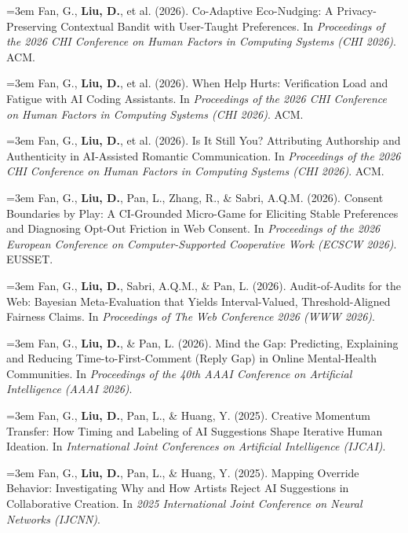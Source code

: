 \documentclass[a4paper,11pt]{article}
\newcommand{\publication}[2]{%
  \par\addvspace{8pt}\noindent
  \begin{minipage}{\linewidth}
    \linespread{1.06}\fontsize{10.8}{13.4}\selectfont\raggedright
    \hangindent=3em\hangafter=1
    \makebox[3em][l]{\textcolor{teal}{[#1]}}#2
  \end{minipage}\par}
\begin{document}
\publication{R5}{Fan, G., \textbf{Liu, D.}, et al. (2026). Co-Adaptive Eco-Nudging: A Privacy-Preserving Contextual Bandit with User-Taught Preferences. In \emph{Proceedings of the 2026 CHI Conference on Human Factors in Computing Systems (CHI 2026)}. ACM.}

\publication{R6}{Fan, G., \textbf{Liu, D.}, et al. (2026). When Help Hurts: Verification Load and Fatigue with AI Coding Assistants. In \emph{Proceedings of the 2026 CHI Conference on Human Factors in Computing Systems (CHI 2026)}. ACM.}

\publication{R7}{Fan, G., \textbf{Liu, D.}, et al. (2026). Is It Still You? Attributing Authorship and Authenticity in AI-Assisted Romantic Communication. In \emph{Proceedings of the 2026 CHI Conference on Human Factors in Computing Systems (CHI 2026)}. ACM.}

\publication{R8}{Fan, G., \textbf{Liu, D.}, Pan, L., Zhang, R., \& Sabri, A.Q.M. (2026). Consent Boundaries by Play: A CI-Grounded Micro-Game for Eliciting Stable Preferences and Diagnosing Opt-Out Friction in Web Consent. In \emph{Proceedings of the 2026 European Conference on Computer-Supported Cooperative Work (ECSCW 2026)}. EUSSET.}

\publication{R9}{Fan, G., \textbf{Liu, D.}, Sabri, A.Q.M., \& Pan, L. (2026). Audit-of-Audits for the Web: Bayesian Meta-Evaluation that Yields Interval-Valued, Threshold-Aligned Fairness Claims. In \emph{Proceedings of The Web Conference 2026 (WWW 2026)}.}

\publication{R10}{Fan, G., \textbf{Liu, D.}, \& Pan, L. (2026). Mind the Gap: Predicting, Explaining and Reducing Time-to-First-Comment (Reply Gap) in Online Mental-Health Communities. In \emph{Proceedings of the 40th AAAI Conference on Artificial Intelligence (AAAI 2026)}.}

\publication{R11}{Fan, G., \textbf{Liu, D.}, Pan, L., \& Huang, Y. (2025). Creative Momentum Transfer: How Timing and Labeling of AI Suggestions Shape Iterative Human Ideation. In \emph{International Joint Conferences on Artificial Intelligence (IJCAI)}.}

\publication{R12}{Fan, G., \textbf{Liu, D.}, Pan, L., \& Huang, Y. (2025). Mapping Override Behavior: Investigating Why and How Artists Reject AI Suggestions in Collaborative Creation. In \emph{2025 International Joint Conference on Neural Networks (IJCNN)}.}

\label{LastPage}
\end{document}
